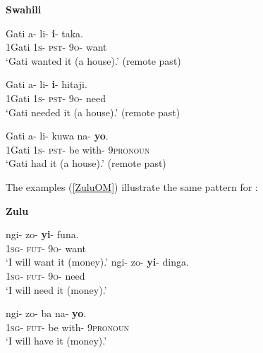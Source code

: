 \documentclass[output=paper,
modfonts
]{langscibook}
\begin{document}
\begin{exe}
\ex\label{SwahiliOM}\textbf{Swahili}\begin{xlist}

\ex \gll Gati a- li- \textbf{i}- taka.  \\
1Gati 1\textsc{s}- \textsc{pst}- 9\textsc{o}- want \\	
\glt `Gati wanted it (a house).' (remote past)

\ex \gll Gati a- li- \textbf{i}- hitaji. \hspace{1in} \\
1Gati 1\textsc{s}- \textsc{pst}- 9\textsc{o}- need \\	
\glt `Gati needed it (a house).' (remote past)

\ex \gll Gati a- li- kuwa na- \textbf{yo}.\\
1Gati 1\textsc{s}- \textsc{pst}- be with- 9\textsc{pronoun}\\
\glt `Gati had it (a house).' (remote past)
\end{xlist}
\end{exe}

%

The examples (\ref{ZuluOM})  illustrate the same pattern for : 

\begin{exe}
\ex\label{ZuluOM}\textbf{Zulu} \begin{xlist}
\ex\gll ngi- zo- \textbf{yi}- funa. \\
1\textsc{sg}- \textsc{fut}- 9\textsc{o}- want\\
\glt `I will want it (money).'
\ex \gll ngi- zo- \textbf{yi}- dinga. \\
1\textsc{sg}- \textsc{fut}- 9\textsc{o}- need\\
\glt `I will need it (money).'

\ex \gll ngi- zo- ba na- \textbf{yo}.\\
1\textsc{sg}- \textsc{fut}- be with- 9\textsc{pronoun}\\
\glt `I will have it (money).'
\end{xlist}
\end{exe}
\end{document}
